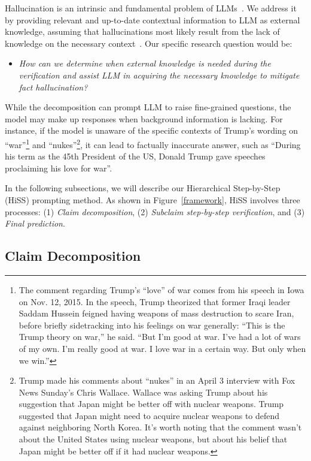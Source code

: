 \documentclass[11pt]{article}
\begin{document}
Hallucination is an intrinsic and fundamental problem of LLMs~\cite{ji2023survey,bang2023multitask}. We address it by providing relevant and up-to-date contextual information to LLM as external knowledge, assuming that hallucinations most likely result from the lack of knowledge on the necessary context~\cite{bang2023multitask}. Our specific research question would be:

\begin{itemize}
\item \emph{How can we determine when external knowledge is needed during the verification and assist LLM in acquiring the necessary knowledge to mitigate fact hallucination?}
\end{itemize}
While the decomposition can prompt LLM to raise fine-grained questions, the model may make up responses when background information is lacking. For instance, if the model is unaware of the specific contexts of Trump's wording on ``war''\footnote{The comment regarding Trump's ``love'' of war comes from his speech in Iowa on Nov. 12, 2015. In the speech, Trump theorized that former Iraqi leader Saddam Hussein feigned having weapons of mass destruction to scare Iran, before briefly sidetracking into his feelings on war generally: ``This is the Trump theory on war,'' he said. ``But I'm good at war. I've had a lot of wars of my own. I'm really good at war. I love war in a certain way. But only when we win.''} and ``nukes''\footnote{Trump made his comments about ``nukes'' in an April 3 interview with Fox News Sunday’s Chris Wallace. Wallace was asking Trump about his suggestion that Japan might be better off with nuclear weapons. Trump suggested that Japan might need to acquire nuclear
weapons to defend against neighboring North Korea. It's worth noting that the comment wasn’t about the United States using nuclear weapons, but about his belief that Japan might be better off if it had nuclear weapons.}, it can lead to factually inaccurate answer, such as ``During his term as the 45th President of the US, Donald Trump gave speeches proclaiming his love for war''.


In the following subsections, we will describe our Hierarchical Step-by-Step (HiSS) prompting method. As shown in Figure~\ref{framework}, HiSS involves three processes: (1) \textit{Claim decomposition}, (2) \textit{Subclaim step-by-step verification}, and (3) \textit{Final prediction}.

\subsection{Claim Decomposition}
\end{document}
